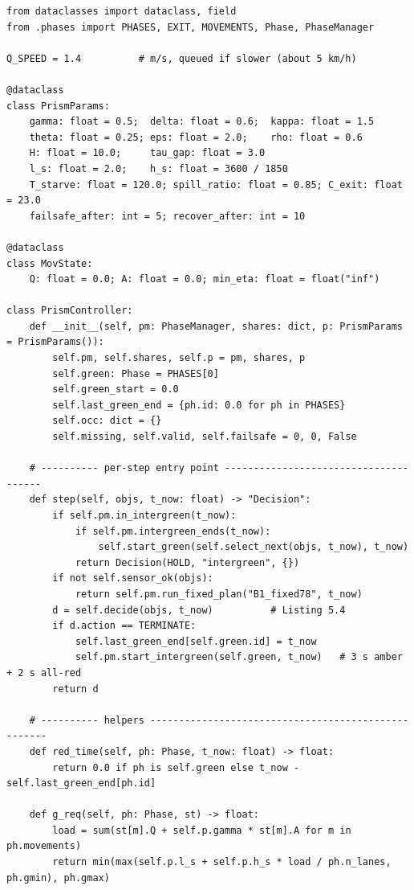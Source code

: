 \begin{lstlisting}[style=py,caption={\texttt{PrismController}: state, phase selection and fail-safe},label={lst:app-prism}]
from dataclasses import dataclass, field
from .phases import PHASES, EXIT, MOVEMENTS, Phase, PhaseManager

Q_SPEED = 1.4          # m/s, queued if slower (about 5 km/h)

@dataclass
class PrismParams:
    gamma: float = 0.5;  delta: float = 0.6;  kappa: float = 1.5
    theta: float = 0.25; eps: float = 2.0;    rho: float = 0.6
    H: float = 10.0;     tau_gap: float = 3.0
    l_s: float = 2.0;    h_s: float = 3600 / 1850
    T_starve: float = 120.0; spill_ratio: float = 0.85; C_exit: float = 23.0
    failsafe_after: int = 5; recover_after: int = 10

@dataclass
class MovState:
    Q: float = 0.0; A: float = 0.0; min_eta: float = float("inf")

class PrismController:
    def __init__(self, pm: PhaseManager, shares: dict, p: PrismParams = PrismParams()):
        self.pm, self.shares, self.p = pm, shares, p
        self.green: Phase = PHASES[0]
        self.green_start = 0.0
        self.last_green_end = {ph.id: 0.0 for ph in PHASES}
        self.occ: dict = {}
        self.missing, self.valid, self.failsafe = 0, 0, False

    # ---------- per-step entry point --------------------------------------
    def step(self, objs, t_now: float) -> "Decision":
        if self.pm.in_intergreen(t_now):
            if self.pm.intergreen_ends(t_now):
                self.start_green(self.select_next(objs, t_now), t_now)
            return Decision(HOLD, "intergreen", {})
        if not self.sensor_ok(objs):
            return self.pm.run_fixed_plan("B1_fixed78", t_now)
        d = self.decide(objs, t_now)          # Listing 5.4
        if d.action == TERMINATE:
            self.last_green_end[self.green.id] = t_now
            self.pm.start_intergreen(self.green, t_now)   # 3 s amber + 2 s all-red
        return d

    # ---------- helpers ----------------------------------------------------
    def red_time(self, ph: Phase, t_now: float) -> float:
        return 0.0 if ph is self.green else t_now - self.last_green_end[ph.id]

    def g_req(self, ph: Phase, st) -> float:
        load = sum(st[m].Q + self.p.gamma * st[m].A for m in ph.movements)
        return min(max(self.p.l_s + self.p.h_s * load / ph.n_lanes, ph.gmin), ph.gmax)


\end{lstlisting}
